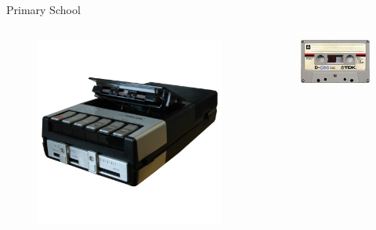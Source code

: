 \documentclass{beamer}
\begin{document}
  \begin{frame}{Primary School}
    \begin{columns}
        \begin{figure}
          \includegraphics[scale=0.3]{images/3t07}
        \end{figure}
        \begin{figure}
          \includegraphics[scale=0.35]{images/tdkc60}
        \end{figure}
    \end{columns}
  \end{frame}
\end{document}
